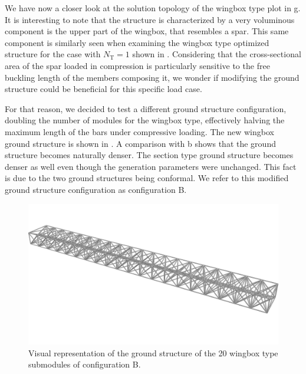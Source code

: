 We have now a closer look at the solution topology of the wingbox type plot in g. It is interesting to note that the structure is characterized by a very voluminous component is the upper part of the wingbox, that resembles a spar. This same component is similarly seen when examining the wingbox type optimized structure for the case with $N_\text{T}=1$ shown in . Considering that the cross-sectional area of the spar loaded in compression is particularly sensitive to the free buckling length of the members composing it, we wonder if modifying the ground structure could be beneficial for this specific load case.

For that reason, we decided to test a different ground structure configuration, doubling the number of modules for the wingbox type, effectively halving the maximum length of the bars under compressive loading. The new wingbox ground structure is shown in . A comparison with b shows that the ground structure becomes naturally denser.  The section type ground structure becomes denser as well even though the generation parameters were unchanged. This fact is due to the two ground structures being conformal. We refer to this modified ground structure configuration as configuration B.

\begin{figure}
    \centering
    \includegraphics[width=0.8\linewidth]{figures/07_aeronautic/00_NACA_gs_b/02_GS_c_iso.png}
        \caption{Visual representation of the ground structure of the 20 wingbox type submodules of configuration B.}
    \label{fig:07_gs_wingbox_b}
\end{figure}

